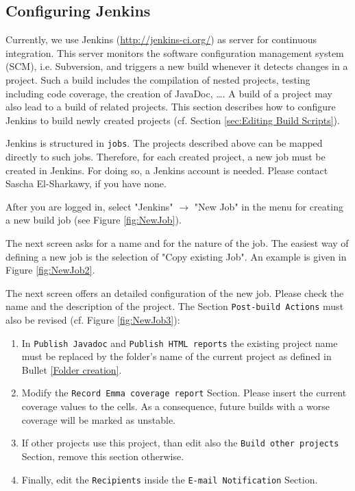 \subsection{Configuring Jenkins}
\label{sec:Configuring Jenkins}
Currently, we use Jenkins (\url{http://jenkins-ci.org/}) as server for continuous integration. This server monitors the software configuration management system (SCM), i.e. Subversion, and triggers a new build whenever it detects changes in a project. Such a build includes the compilation of nested projects, testing including code coverage, the creation of JavaDoc, \ldots. A build of a project may also lead to a build of related projects. This section describes how to configure Jenkins to build newly created projects (cf. Section \ref{sec:Editing Build Scripts}).

Jenkins is structured in \texttt{jobs}. The projects described above can be mapped directly to such jobs. Therefore, for each created project, a new job must be created in Jenkins. For doing so, a Jenkins account is needed. Please contact Sascha El-Sharkawy, if you have none.

After you are logged in, select "Jenkins" $\to$ "New Job" in the menu for creating a new build job (see Figure \vref{fig:NewJob}). 


The next screen asks for a name and for the nature of the job. The easiest way of defining a new job is the selection of "Copy existing Job". An example is given in Figure \vref{fig:NewJob2}.


The next screen offers an detailed configuration of the new job. Please check the name and the description of the project. The Section \texttt{Post-build Actions} must also be revised (cf. Figure \vref{fig:NewJob3}):
\begin{enumerate}
	\item In \texttt{Publish Javadoc} and \texttt{Publish HTML reports} the existing project name must be replaced by the folder's name of the current project as defined in Bullet \vref{Folder creation}.
	\item Modify the \texttt{Record Emma coverage report} Section. Please insert the current coverage values to the cells. As a consequence, future builds with a worse coverage will be marked as unstable.
	\item If other projects use this project, than edit also the \texttt{Build other projects} Section, remove this section otherwise.
	\item Finally, edit the \texttt{Recipients} inside the \texttt{E-mail Notification} Section.
\end{enumerate}

